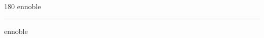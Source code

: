 
\begin{frame}
\begin{center}
\begin{turn}{180}
{\fontsize{2.5cm}{1em}\selectfont ennoble}
\end{turn}
\vspace{1em}\par  
\hrule
\vspace{1em}\par  
{\fontsize{2.5cm}{1em}\selectfont ennoble}
\end{center}
\end{frame}
